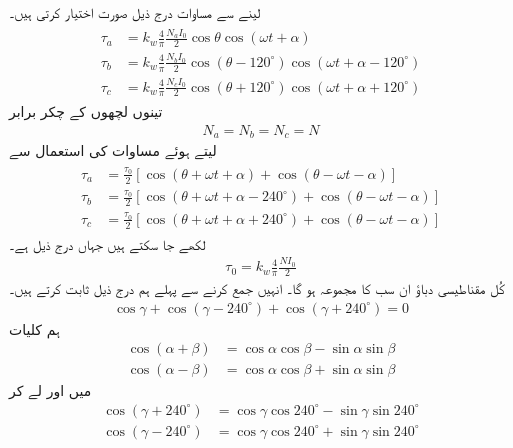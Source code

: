 لینے سے  مساوات  درج ذیل صورت اختیار کرتی ہیں۔
\begin{gather}
\begin{aligned}
\tau_a&=k_w \frac{4}{\pi}\frac{N_a I_0}{2} \cos \theta \cos (\omega t +\alpha)\\
\tau_b&=k_w \frac{4}{\pi}\frac{N_b I_0}{2} \cos (\theta -120^{\circ})\cos (\omega t +\alpha -120^{\circ})\\
\tau_c&=k_w \frac{4}{\pi}\frac{N_c I_0}{2} \cos (\theta +120^{\circ})\cos (\omega t +\alpha +120^{\circ})
\end{aligned}
\end{gather}
تینوں لچھوں کے چکر برابر
\begin{align*}
N_a=N_b=N_c=N
\end{align*}
لیتے ہوئے مساوات  کی استعمال سے
\begin{gather}
\begin{aligned}\label{مساوات_تبادلہ_تین_گھومتے_دباو}
\tau_a&=\frac{\tau_0}{2} \left[\cos (\theta +\omega t +\alpha) +\cos (\theta -\omega t -\alpha) \right]\\
\tau_b&=\frac{\tau_0}{2} \left[\cos (\theta +\omega t +\alpha-240^{\circ}) +\cos (\theta -\omega t -\alpha) \right]\\
\tau_c&=\frac{\tau_0}{2} \left[\cos (\theta +\omega t +\alpha+240^{\circ}) +\cos (\theta -\omega t -\alpha) \right]
\end{aligned}
\end{gather}
لکھے جا سکتے ہیں جہاں  درج ذیل ہے۔
\begin{align}
\tau_0=k_w \frac{4}{\pi}\frac{N I_0}{2}
\end{align}
کُل مقناطیسی دباؤ  ان سب کا مجموعہ ہو گا۔ انہیں جمع کرنے سے پہلے ہم  درج ذیل ثابت کرتے ہیں۔
\begin{align*}
\cos \gamma +\cos (\gamma -240^{\circ})+\cos (\gamma+240^{\circ})=0
\end{align*}
ہم  کلیات 
\begin{align*}
\cos  (\alpha +\beta)&=\cos \alpha \cos \beta-\sin \alpha \sin \beta\\
\cos  (\alpha -\beta)&=\cos \alpha \cos \beta+\sin \alpha \sin \beta
\end{align*}
 میں   اور  لے کر
\begin{align*}
\cos (\gamma+240^{\circ})&=\cos \gamma \cos 240^{\circ}-\sin \gamma \sin 240^{\circ}\\
\cos (\gamma-240^{\circ})&=\cos \gamma \cos 240^{\circ}+\sin \gamma \sin 240^{\circ}
\end{align*}
